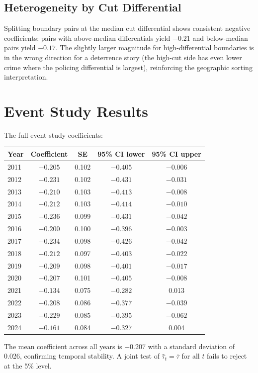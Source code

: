 \documentclass[12pt]{article}
\begin{document}
\subsection{Heterogeneity by Cut Differential}

Splitting boundary pairs at the median cut differential shows consistent negative coefficients: pairs with above-median differentials yield $-0.21$ and below-median pairs yield $-0.17$. The slightly larger magnitude for high-differential boundaries is in the wrong direction for a deterrence story (the high-cut side has even lower crime where the policing differential is largest), reinforcing the geographic sorting interpretation.


\section{Event Study Results}

The full event study coefficients:

\begin{center}
\begin{tabular}{lcccc}
\toprule
Year & Coefficient & SE & 95\% CI lower & 95\% CI upper \\
\midrule
2011 & $-0.205$ & 0.102 & $-0.405$ & $-0.006$ \\
2012 & $-0.231$ & 0.102 & $-0.431$ & $-0.031$ \\
2013 & $-0.210$ & 0.103 & $-0.413$ & $-0.008$ \\
2014 & $-0.212$ & 0.103 & $-0.414$ & $-0.010$ \\
2015 & $-0.236$ & 0.099 & $-0.431$ & $-0.042$ \\
2016 & $-0.200$ & 0.100 & $-0.396$ & $-0.003$ \\
2017 & $-0.234$ & 0.098 & $-0.426$ & $-0.042$ \\
2018 & $-0.212$ & 0.097 & $-0.403$ & $-0.022$ \\
2019 & $-0.209$ & 0.098 & $-0.401$ & $-0.017$ \\
2020 & $-0.207$ & 0.101 & $-0.405$ & $-0.008$ \\
2021 & $-0.134$ & 0.075 & $-0.282$ & 0.013 \\
2022 & $-0.208$ & 0.086 & $-0.377$ & $-0.039$ \\
2023 & $-0.229$ & 0.085 & $-0.395$ & $-0.062$ \\
2024 & $-0.161$ & 0.084 & $-0.327$ & 0.004 \\
\bottomrule
\end{tabular}
\end{center}

The mean coefficient across all years is $-0.207$ with a standard deviation of 0.026, confirming temporal stability. A joint test of $\hat{\tau}_t = \bar{\tau}$ for all $t$ fails to reject at the 5\% level.
\end{document}
